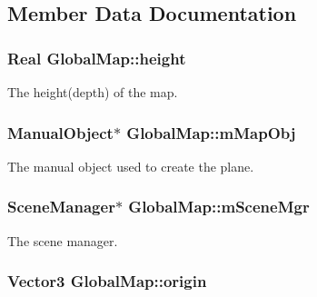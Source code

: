 \subsection{\-Member \-Data \-Documentation}
\hypertarget{classGlobalMap_a8c44af901d0f19fb8a57845d03e24063}{
\subsubsection[{height}]{\setlength{\rightskip}{0pt plus 5cm}\-Real {\bf \-Global\-Map\-::height}}}\label{classGlobalMap_a8c44af901d0f19fb8a57845d03e24063}
\-The height(depth) of the map. \hypertarget{classGlobalMap_a59b1001eec405852745ecf64a47915be}{
\subsubsection[{m\-Map\-Obj}]{\setlength{\rightskip}{0pt plus 5cm}\-Manual\-Object$\ast$ {\bf \-Global\-Map\-::m\-Map\-Obj}}}\label{classGlobalMap_a59b1001eec405852745ecf64a47915be}
\-The manual object used to create the plane. \hypertarget{classGlobalMap_a58e2848e9c5f3abe6effaf12176c2c8e}{
\subsubsection[{m\-Scene\-Mgr}]{\setlength{\rightskip}{0pt plus 5cm}\-Scene\-Manager$\ast$ {\bf \-Global\-Map\-::m\-Scene\-Mgr}}}\label{classGlobalMap_a58e2848e9c5f3abe6effaf12176c2c8e}
\-The scene manager. \hypertarget{classGlobalMap_a79a33b5d851acd03cff2d74b1aaaf020}{
\subsubsection[{origin}]{\setlength{\rightskip}{0pt plus 5cm}\-Vector3 {\bf \-Global\-Map\-::origin}}}\label{classGlobalMap_a79a33b5d851acd03cff2d74b1aaaf020}
